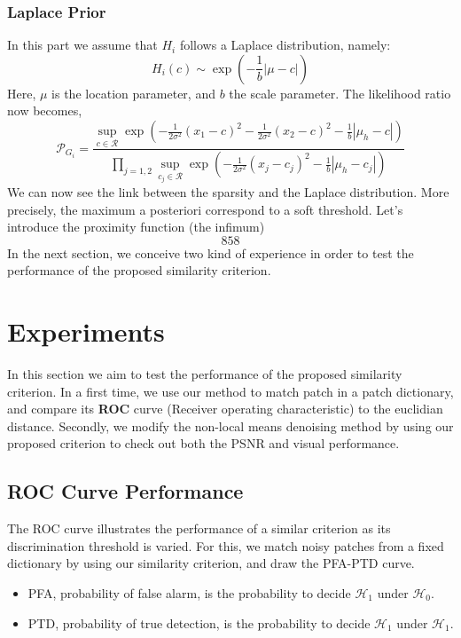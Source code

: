 \documentclass[runningheads]{llncs}
\newcommand{\wdist}[3]{\frac{1}{2#3}(#1-#2 )^2}
\begin{document}
\subsubsection{Laplace Prior}
In this part we assume that $H_i$ follows a Laplace distribution, namely:
\begin{equation}
 H_i(c) \sim \exp(-\frac{1}{b}|\mu-c|)
\end{equation}
Here, $\mu$ is the location parameter, and $b$ the scale parameter. The likelihood ratio now becomes,
\[
 \mathcal{P}_{G_i} = \frac{\sup_{c\in \mathcal{R}} \exp(-\wdist{x_1}{c}{\sigma^2}-\wdist{x_2}{c}{\sigma^2}-\frac{1}{b}|\mu_h-c|) }
{\prod_{j=1,2}\sup_{c_j\in \mathcal{R}} \exp(-\frac{1}{2\sigma^2}(x_j-c_j )^2-\frac{1}{b}|\mu_h-c_j|)  }
\]
We can now see the link between the sparsity and the Laplace distribution. More precisely, the maximum a posteriori correspond to a soft threshold. Let's introduce the proximity function (the infimum)
\[
858
\]
In the next section, we conceive two kind of experience in order to test the performance of the proposed similarity criterion.

\section{Experiments}
In this section we aim to test the performance of the proposed similarity criterion. In a first time, we use our method to match patch in a patch dictionary, and compare its \textbf{ROC} curve (Receiver operating characteristic) to the euclidian distance. Secondly, we modify the non-local means denoising method by using our proposed criterion to check out both the PSNR and visual performance.
\subsection{ROC Curve Performance}
The ROC curve illustrates the performance of a similar criterion as its discrimination threshold is varied. For this, we match noisy patches from a fixed dictionary by using our similarity criterion, and draw the PFA-PTD curve. 
\begin{itemize}
 \item PFA, probability of false alarm, is the probability to decide $\mathcal{H}_1$ under $\mathcal{H}_0$.
 \item PTD, probability of true detection, is the probability to decide $\mathcal{H}_1$ under $\mathcal{H}_1$.
\end{itemize}
\end{document}

